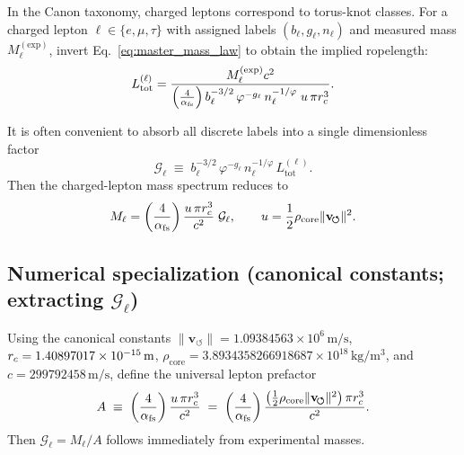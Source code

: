 \documentclass[10pt]{article}
\newcommand{\vswirl}{\mathbf{v}_{\!\boldsymbol{\circlearrowleft}}}
\begin{document}
        In the Canon taxonomy, charged leptons correspond to torus-knot classes.
        For a charged lepton $\ell\in\{e,\mu,\tau\}$ with assigned labels $(b_\ell,g_\ell,n_\ell)$ and measured mass $M_\ell^{(\mathrm{exp})}$,
        invert Eq.~\eqref{eq:master_mass_law} to obtain the implied ropelength:
        \begin{equation}
            L_{\text{tot}}^{(\ell)}=
            \frac{M_\ell^{(\mathrm{exp})}c^2}{
                \left(\frac{4}{\alpha_{\rm fs}}\right)
                b_\ell^{-3/2}\,\varphi^{-g_\ell}\,n_\ell^{-1/\varphi}\;
                u\,\pi r_c^3 }.
            \label{eq:Ltot_inversion}
        \end{equation}

        It is often convenient to absorb all discrete labels into a single dimensionless factor
        \begin{equation}
            \mathcal{G}_\ell \;\equiv\;
            b_\ell^{-3/2}\,\varphi^{-g_\ell}\,n_\ell^{-1/\varphi}\,L_{\text{tot}}^{(\ell)}.
            \label{eq:Gell_def}
        \end{equation}
        Then the charged-lepton mass spectrum reduces to
        \begin{equation}
            M_\ell=
            \left(\frac{4}{\alpha_{\rm fs}}\right)\frac{u\,\pi \rc^3}{c^2}\;\mathcal{G}_\ell,
            \qquad
            u=\frac12\rho_{\text{core}}\|\vswirl\|^2.
            \label{eq:lepton_mass_Gell}
        \end{equation}

    \subsection{Numerical specialization (canonical constants; extracting $\mathcal{G}_\ell$)}

        Using the canonical constants $\|\vswirl\|=1.09384563\times10^6\,\mathrm{m/s}$,
        $r_c=1.40897017\times10^{-15}\,\mathrm{m}$,
        $\rho_{\text{core}}=3.8934358266918687\times10^{18}\,\mathrm{kg/m^3}$,
        and $c=299792458\,\mathrm{m/s}$, define the universal lepton prefactor
        \begin{equation}
            A \;\equiv\; \left(\frac{4}{\alpha_{\rm fs}}\right)\frac{u\,\pi \rc^3}{c^2}
            \;=\;\left(\frac{4}{\alpha_{\rm fs}}\right)\frac{\left(\frac12\rho_{\text{core}}\|\vswirl\|^2\right)\pi \rc^3}{c^2}.
            \label{eq:A_prefactor}
        \end{equation}
        Then $\mathcal{G}_\ell = M_\ell/A$ follows immediately from experimental masses.
\end{document}
